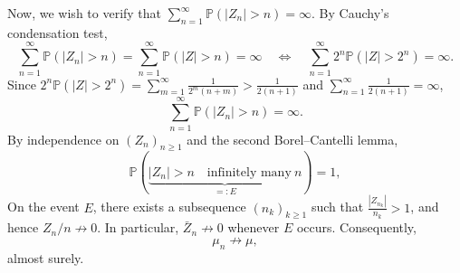 \documentclass[preprint]{imsart}
\theoremstyle{plain}
\theoremstyle{remark}
\begin{document}
\begin{appendix}
Now, we wish to verify that $\sum_{n=1}^{\infty}\mathbb{P}(|Z_n| > n)=\infty$. By Cauchy's condensation test, 
$$
\sum_{n=1}^{\infty}\mathbb{P}(|Z_n| > n)= \sum_{n=1}^{\infty}\mathbb{P}(|Z| > n)=\infty \quad \Leftrightarrow \quad \sum_{n=1}^{\infty} 2^n \mathbb{P}(|Z|>2^n) = \infty.
$$
Since $2^n\mathbb{P}(|Z|>2^n)= \sum_{m=1}^{\infty} \frac{1}{2^m(n+m)} > \frac{1}{2(n+1)}$ and $\sum_{n=1}^{\infty}\frac{1}{2(n+1)}=\infty$, $$\sum_{n=1}^{\infty}\mathbb{P}(|Z_n| > n) =\infty.$$ 
By independence on $(Z_n)_{n\ge 1}$ and the second Borel--Cantelli lemma,
$$
\mathbb{P}(\underbrace{|Z_n|>n \quad \text{infinitely many} ~ n}_{=:E}) = 1,
$$ 
On the event $E$, there exists a subsequence $(n_k)_{k\ge 1}$ such that $\frac{|Z_{n_k}|}{n_k} > 1$, and hence $Z_n/n \not\to 0$. In particular, $\bar Z_n \not\to 0$ whenever $E$ occurs. Consequently,
$$
\mu_n \not\to \mu,
$$
almost surely.



\end{appendix}






%  
%  


     
\end{document}
